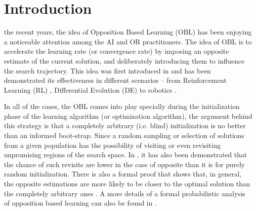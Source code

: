 \documentclass[journal]{IEEEtran}
\begin{document}
%
\IEEEpeerreviewmaketitle



\section{Introduction}
% 
% 
% 
% 

 the recent years, the idea of Opposition Based Learning (OBL) has been enjoying a noticeable attention among the AI and OR practitioners. The idea of OBL is to accelerate the learning rate (or convergence rate) by imposing an opposite estimate of the current solution, and deliberately introducing them to influence the search trajectory. This idea was first introduced in \cite{obl-main} and has been demonstrated its effectiveness in different scenarios -- from Reinforcement Learning (RL) \cite{obl-rl}, Differential Evolution (DE) \cite{ode-main} to robotics \cite{ode-robot}. 

In all of the cases, the OBL comes into play specially during the initialization phase of the learning algorithm (or optimization algorithm), the argument behind this strategy is that a completely arbitrary (i.e. blind) initialization is no better than an informed boot-strap. Since a random sampling or selection of solutions from a given population has the possibility of visiting or even revisiting unpromising regions of the search space. In \cite{ode-main}, it has also been demonstrated that the chance of such revisits are lower in the case of opposite than it is for purely random initialization. There is also a formal proof that shows that, in general, the opposite estimations are more likely to be closer to the optimal solution than the completely arbitrary ones \cite{theory-1}. A more details of a formal probabilistic analysis of opposition based learning can also be found in \cite{theory-2}.
\end{document}
